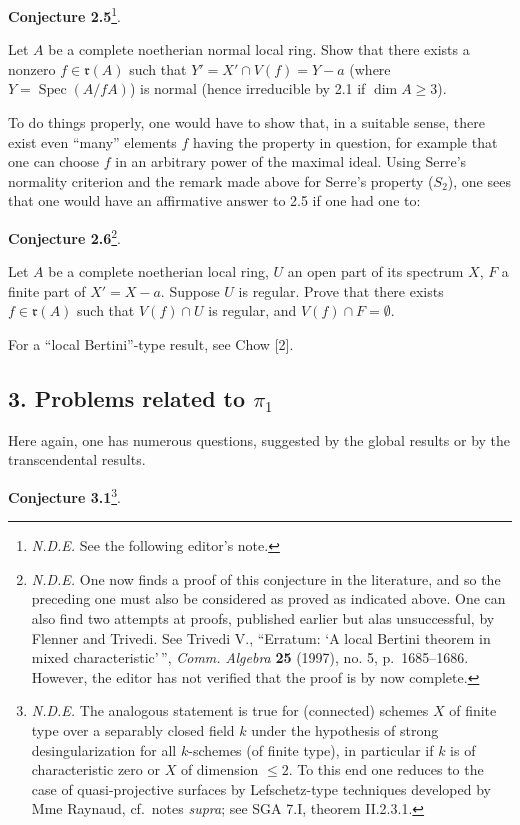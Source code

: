\documentclass[
]{article}
\begin{document}
\textbf{Conjecture 2.5}\footnote{\emph{N.D.E.} See the following
  editor's note.}.

Let \(A\) be a complete noetherian normal local ring. Show that there
exists a nonzero \(f \in \mathfrak{r}(A)\) such that
\(Y' = X' \cap V(f) = Y - {a}\) (where
\(Y = \operatorname{Spec}(A/fA)\)) is normal (hence irreducible by 2.1
if \(\dim A \geqslant 3\)).

To do things properly, one would have to show that, in a suitable sense,
there exist even ``many'' elements \(f\) having the property in
question, for example that one can choose \(f\) in an arbitrary power of
the maximal ideal. Using Serre's normality criterion and the remark made
above for Serre's property (\(S_{2}\)), one sees that one would have an
affirmative answer to 2.5 if one had one to:

\textbf{Conjecture 2.6}\footnote{\emph{N.D.E.} One now finds a proof of
  this conjecture in the literature, and so the preceding one must also
  be considered as proved as indicated above. One can also find two
  attempts at proofs, published earlier but alas unsuccessful, by
  Flenner and Trivedi. See Trivedi V., ``Erratum: `A local Bertini
  theorem in mixed characteristic'\,'', \emph{Comm. Algebra} \textbf{25}
  (1997), no. 5, p.~1685--1686. However, the editor has not verified
  that the proof is by now complete.}.

Let \(A\) be a complete noetherian local ring, \(U\) an open part of its
spectrum \(X\), \(F\) a finite part of \(X' = X - {a}\). Suppose \(U\)
is regular. Prove that there exists \(f \in \mathfrak{r}(A)\) such that
\(V(f) \cap U\) is regular, and \(V(f) \cap F = \emptyset\).

For a ``local Bertini''-type result, see Chow {[}2{]}.

\subsection{\texorpdfstring{3. Problems related to
\(\pi_{1}\)}{3. Problems related to \textbackslash pi\_\{1\}}}\label{problems-related-to-pi_1}

Here again, one has numerous questions, suggested by the global results
or by the transcendental results.

\textbf{Conjecture 3.1}\footnote{\emph{N.D.E.} The analogous statement
  is true for (connected) schemes \(X\) of finite type over a separably
  closed field \(k\) under the hypothesis of strong desingularization
  for all \(k\)-schemes (of finite type), in particular if \(k\) is of
  characteristic zero or \(X\) of dimension \(\leqslant 2\). To this end
  one reduces to the case of quasi-projective surfaces by Lefschetz-type
  techniques developed by Mme Raynaud, cf.~notes \emph{supra}; see SGA
  7.I, theorem II.2.3.1.}.
\end{document}
